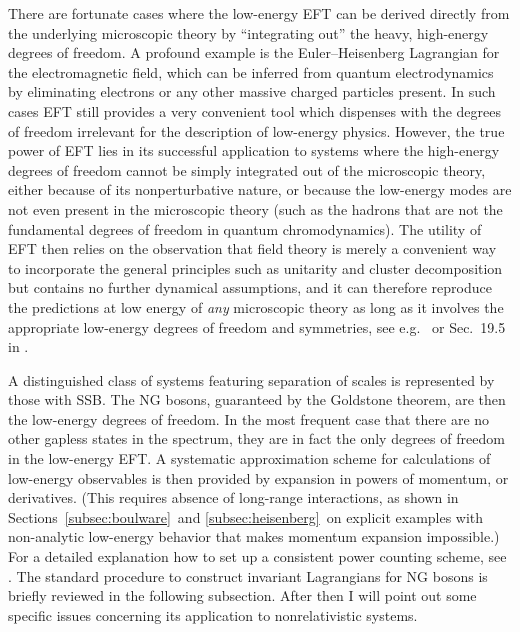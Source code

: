 \documentclass[final,2p,times,12pt,sort&compress]{elsarticle}
\begin{document}
There are fortunate cases where the low-energy EFT can be derived directly from
the underlying microscopic theory by ``integrating out'' the heavy, high-energy
degrees of freedom. A profound example is the Euler--Heisenberg Lagrangian for
the electromagnetic field, which can be inferred from quantum electrodynamics
by eliminating electrons or any other massive charged particles present. In such
cases EFT still provides a very convenient tool which dispenses with the
degrees of freedom irrelevant for the description of low-energy physics.
However, the true power of EFT lies in its successful application to systems
where the high-energy degrees of freedom cannot be simply integrated out of the
microscopic theory, either because of its nonperturbative nature, or because
the low-energy modes are not even present in the microscopic theory (such as
the hadrons that are not the fundamental degrees of freedom in quantum
chromodynamics). The utility of EFT then relies on the observation that field
theory is merely a convenient way to incorporate the general principles such as
unitarity and cluster decomposition but contains no further dynamical
assumptions, and it can therefore reproduce the predictions at low energy of
\emph{any} microscopic theory as long as it involves the appropriate low-energy
degrees of freedom and symmetries, see e.g.~\cite{Burgess:1998ku} or Sec.~19.5
in \cite{Weinberg:1996v2}.

A distinguished class of systems featuring separation of scales is represented
by those with SSB. The NG bosons, guaranteed by the Goldstone theorem, are then
the low-energy degrees of freedom. In the most frequent case that there are no
other gapless states in the spectrum, they are in fact the only degrees of
freedom in the low-energy EFT. A systematic approximation scheme for
calculations of low-energy observables is then provided by expansion in powers
of momentum, or derivatives. (This requires absence of long-range interactions,
as shown in Sections~\ref{subsec:boulware}\ and \ref{subsec:heisenberg}\ on
explicit examples with non-analytic low-energy behavior that makes momentum
expansion impossible.) For a detailed explanation how to set up a
consistent power counting scheme, see \cite{Manohar:1996cq,Burgess:1998ku}.
The standard procedure to construct invariant Lagrangians for NG bosons
\cite{Coleman:1969sm,Callan:1969sn} is briefly reviewed in the following
subsection. After then I will point out some specific issues concerning its
application to nonrelativistic systems.
\end{document}
